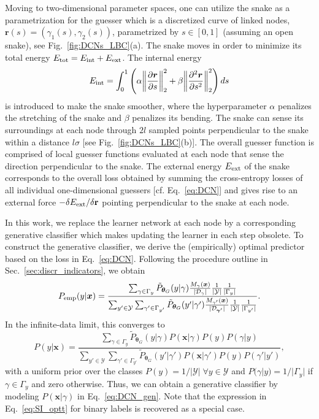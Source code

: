 \documentclass[twocolumn,aps,pra,superscriptaddress,tightlines,nofootinbib]{revtex4-2}
\begin{document}
	\indent Moving to two-dimensional parameter spaces, one can utilize the snake as a parametrization for the guesser which is a discretized curve of linked nodes, $\bm{r}(s)=\left(\gamma_{1}(s),\gamma_{2}(s)\right)$, parametrized by $s \in [0,1]$ (assuming an open snake), see Fig.~\ref{fig:DCNs_LBC}(a). The snake moves in order to minimize its total energy $E_{\rm tot}=E_{\rm int} + E_{\rm ext}$. The internal energy
	\begin{equation}
		E_{\rm int} = \int_0^1\left(\alpha \norm{\frac{\partial \bm{r}}{\partial s}}_{2}^2+\beta\norm{\frac{\partial^2 \bm{r}}{\partial s^2}}_{2}^2\right) ds
	\end{equation}
	is introduced to make the snake smoother, where the hyperparameter $\alpha$ penalizes the stretching of the snake and $\beta$ penalizes its bending. The snake can sense its surroundings at each node through $2l$ sampled points perpendicular to the snake within a distance $l \sigma$ [see Fig.~\ref{fig:DCNs_LBC}(b)]. The overall guesser function is comprised of local guesser functions evaluated at each node that sense the direction perpendicular to the snake. The external energy $E_{\rm ext}$ of the snake corresponds to the overall loss obtained by summing the cross-entropy losses of all individual one-dimensional guessers [cf. Eq.~\eqref{eq:DCN}] and gives rise to an external force $-\delta E_{\rm ext}/\delta \mathbf{r}$ pointing perpendicular to the snake at each node.
	
	\indent In this work, we replace the learner network at each node by a corresponding generative classifier which makes updating the learner in each step obsolete. To construct the generative classifier, we derive the (empirically) optimal predictor based on the loss in Eq.~\eqref{eq:DCN}. Following the procedure outline in Sec.~\ref{sec:discr_indicators}, we obtain 
	\begin{equation}
		P_{\rm emp}(y|\bm{x}) = \frac{\sum_{\gamma \in \Gamma_{y}} \tilde{P}_{\bm{\theta}_{G}}(y|\gamma) \frac{M_{\gamma}(\bm{x})}{|\mathcal{D}_{\gamma}|} \frac{1}{|\mathcal{Y}|}\frac{1}{|\Gamma_{y}|}}{\sum_{y' \in \mathcal{Y}} \sum_{\gamma' \in \Gamma_{y'}} \tilde{P}_{\bm{\theta}_{G}}(y'|\gamma') \frac{M_{\gamma'}(\bm{x})}{|\mathcal{D}_{\bm{\gamma}'}|} \frac{1}{|\mathcal{Y}|}\frac{1}{|\Gamma_{y'}|}}.
	\end{equation}
	In the infinite-data limit, this converges to 
	\begin{equation}\label{eq:DCN_gen}
		P(y|\bm{x}) = \frac{\sum_{\gamma \in \Gamma_{y}} \tilde{P}_{\bm{\theta}_{G}}(y|\gamma)P(\bm{x}|\gamma)P(y)P(\gamma|y)}{\sum_{y'\in \mathcal{Y}} \sum_{\gamma' \in \Gamma_{y'}}\tilde{P}_{\bm{\theta}_{G}}(y'|\gamma')P(\bm{x}|\gamma')P(y)P(\gamma'|y')},
	\end{equation}
	with a uniform prior over the classes $P(y) = 1/|\mathcal{Y}|\; \forall y \in \mathcal{Y}$ and $P(\gamma|y) = 1/|\Gamma_{y}|$ if $\gamma \in \Gamma_{y}$ and zero otherwise. Thus, we can obtain a generative classifier by modeling $P(\bm{x}|\gamma)$ in Eq.~\eqref{eq:DCN_gen}. Note that the expression in Eq.~\eqref{eq:SI_optt} for binary labels is recovered as a special case.\\
	
\end{document}
